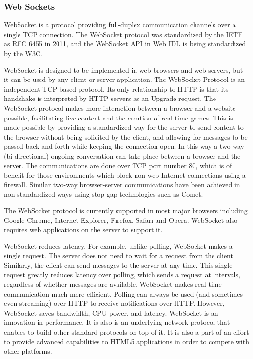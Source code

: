 \subsubsection{Web Sockets}
WebSocket is a protocol providing full-duplex communication channels over a single TCP connection. The WebSocket protocol was standardized by the IETF as RFC 6455 in 2011, and the WebSocket API in Web IDL is being standardized by the W3C.

WebSocket is designed to be implemented in web browsers and web servers, but it can be used by any client or server application. The WebSocket Protocol is an independent TCP-based protocol. Its only relationship to HTTP is that its handshake is interpreted by HTTP servers as an Upgrade request. The WebSocket protocol makes more interaction between a browser and a website possible, facilitating live content and the creation of real-time games. This is made possible by providing a standardized way for the server to send content to the browser without being solicited by the client, and allowing for messages to be passed back and forth while keeping the connection open. In this way a two-way (bi-directional) ongoing conversation can take place between a browser and the server. The communications are done over TCP port number 80, which is of benefit for those environments which block non-web Internet connections using a firewall. Similar two-way browser-server communications have been achieved in non-standardized ways using stop-gap technologies such as Comet.

The WebSocket protocol is currently supported in most major browsers including Google Chrome, Internet Explorer, Firefox, Safari and Opera. WebSocket also requires web applications on the server to support it.

WebSocket reduces latency. For example, unlike polling, WebSocket makes a single request. The server does not need to wait for a request from the client. Similarly, the client can send messages to the server at any time. This single request greatly reduces latency over polling, which sends a request at intervals, regardless of whether messages are available. WebSocket makes real-time communication much more efficient. Polling can always be used (and sometimes even streaming) over HTTP to receive notifications over HTTP. However, WebSocket saves bandwidth, CPU power, and latency. WebSocket is an innovation in performance. It is also is an underlying network protocol that enables to build other standard protocols on top of it. It is also a part of an effort to provide advanced capabilities to HTML5 applications in order to compete with other platforms.

